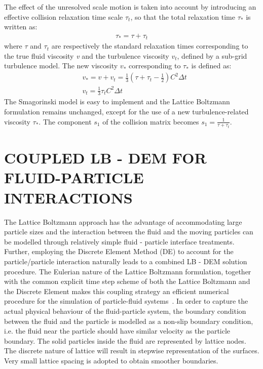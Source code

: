 \documentclass[12pt,a4paper,twocolumn,fleqn]{narms}
\begin{document}
The effect of the unresolved scale motion is taken into account by introducing an effective collision relaxation time scale $\tau_{t}$, so that the total relaxation time $\tau_{*}$ is written as:
\begin{align}
\tau_{*}=\tau + \tau_{t}
\end{align}
where $\tau$ and $\tau_{t}$ are respectively the standard relaxation times corresponding to the true fluid viscosity \textit{v} and the turbulence viscosity $\mathit{v}_{\mathit{t}}$, defined by a sub-grid turbulence model. The new viscosity $\mathit{v}_{*}$ corresponding to $\tau_{*}$ is defined as:
\begin{align}
& \mathit{v}_{*}=\mathit{v}+\mathit{v}_{\mathit{t}}=\frac{1}{3}(\tau+\tau_{t}-\frac{1}{2})\mathit{C}^{2} \Delta \mathit{t}  \\
& \mathit{v}_{\mathit{t}}=\frac{1}{3}\tau_{\mathit{t}}\mathit{C}^{2} \Delta \textit{t}
\end{align}
The Smagorinski model is easy to implement and the Lattice Boltzmann formulation remains unchanged, except for the use of a new turbulence-related viscosity $\tau_{*}$. The component $s_1$ of the collision matrix becomes $s_1 = \frac{1}{\tau+\tau_t}$.
\section{COUPLED LB - DEM FOR FLUID-PARTICLE INTERACTIONS}
The Lattice Boltzmann approach has the advantage of accommodating large particle sizes and the interaction between the fluid and the moving particles can be modelled through relatively simple fluid - particle interface treatments. Further, employing the Discrete Element Method (DE) to account for the particle/particle interaction naturally leads to a combined LB - DEM solution procedure. The Eulerian nature of the Lattice Boltzmann formulation, together with the common explicit time step scheme of both the Lattice Boltzmann and the Discrete Element makes this coupling strategy an efficient numerical procedure for the simulation of particle-fluid systems~. In order to capture the actual physical behaviour of the fluid-particle system, the boundary condition between the fluid and the particle is modelled as a non-slip boundary condition, i.e. the fluid near the particle should have similar velocity as the particle boundary. The solid particles inside the fluid are represented by lattice nodes. The discrete nature of lattice will result in stepwise representation of the surfaces. Very small lattice spacing is adopted to obtain smoother boundaries.
\end{document}
